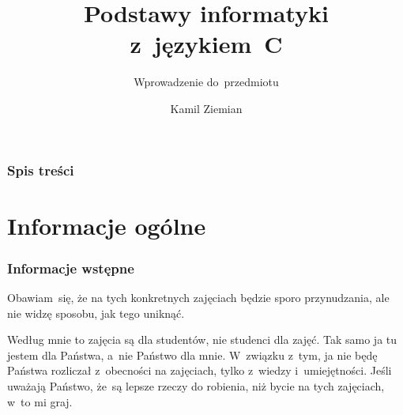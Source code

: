 \documentclass[10pt,t]{beamer}
\title{Podstawy informatyki z~językiem~C}
\subtitle{Wprowadzenie do~przedmiotu}
\author{Kamil Ziemian}
\date{}
\begin{document}





\RaggedRight





\maketitle





\begin{frame}
  \frametitle{Spis treści}


  \tableofcontents

\end{frame}





\section{Informacje ogólne}



\begin{frame}
  \frametitle{Informacje wstępne}


  Obawiam~się, że na tych konkretnych zajęciach będzie sporo przynudzania,
  ale nie widzę sposobu, jak tego uniknąć.

  Według mnie to zajęcia są dla studentów, nie studenci dla zajęć. Tak samo
  ja tu jestem dla Państwa, a~nie Państwo dla mnie. W~związku z~tym, ja nie
  będę Państwa rozliczał z~obecności na zajęciach, tylko z~wiedzy
  i~umiejętności. Jeśli uważają Państwo, że~są lepsze rzeczy do robienia,
  niż bycie na tych zajęciach, w~to mi graj.

\end{frame}
\end{document}
